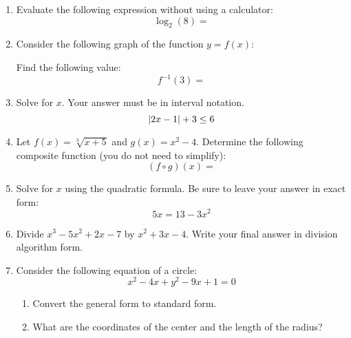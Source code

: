 \documentclass[letterpaper,12pt,fleqn]{article}
\begin{document}
\begin{enumerate}
\item Evaluate the following expression without using a calculator:
  \[\log_2(8)=\]

\item Consider the following graph of the function $y=f(x)$:


  Find the following value:
  \[f^{-1}(3)=\]

\item Solve for $x$. Your answer must be in interval notation.
  \[\lvert2x-1\rvert+3\le6\]

  \vspace{4in}

\item Let $f(x)=\sqrt[3]{x+5}$ and $g(x)=x^2-4$. Determine the following composite
  function (you do not need to simplify):
  \[(f\circ g)(x)=\]

\item Solve for $x$ using the quadratic formula. Be sure to leave your answer in exact
  form:
  \[5x=13-3x^2\]

  \newpage

\item Divide $x^3-5x^2+2x-7$ by $x^2+3x-4$. Write your final answer in division
  algorithm form.

  \newpage

\item Consider the following equation of a circle:
  \[x^2-4x+y^2-9x+1=0\]
  \begin{enumerate}
  \item Convert the general form to standard form.

    \vspace{3in}

  \item What are the coordinates of the center and the length of the radius?


\end{enumerate}
\end{enumerate}
\end{document}
